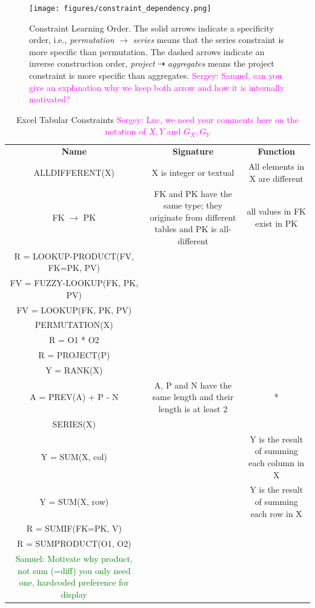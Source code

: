 \documentclass{ecai}
\newcommand{\sergey}[1]{\textcolor{magenta}{{\sc Sergey:} #1}\xspace}
\newcommand{\samuel}[1]{\textcolor{green}{{\sc Samuel:} #1}\xspace}
\newcommand{\format}[1]{\textit{#1}\xspace}
\newcommand{\CName}{Name\xspace}
\newcommand{\CSignature}{Signature\xspace}
\newcommand{\CFunction}{Function\xspace}
\begin{document}
\begin{figure}[htb]
  \centering
  \texttt{[image: figures/constraint\_dependency.png]}
  \caption{Constraint Learning Order. The solid arrows indicate a specificity order, i.e., \textit{permutation} $\rightarrow$ \textit{series} means that the series constraint is more specific than permutation. The dashed arrows indicate an inverse construction order, \textit{project} $\dashrightarrow$ \textit{aggregates} means the project constraint is more specific than aggregates. \sergey{Samuel,  can you give an explanation why we keep both arrow and how it is internally motivated?}}
  \label{fig:learning_order}
\end{figure}


\newcommand{\numeric}{\format{numeric}}
\newcommand{\textual}{\format{textual}}
\newcommand{\integer}{\format{integer}}
\newcommand{\length}{\format{length}}
\newcommand{\nat}{\mathcal{N}}

\begin{table}
  \centering
  \begin{tabular}{ccc}
    \textbf{\CName} & \textbf{\CSignature} & \textbf{\CFunction}\\
    ALLDIFFERENT(X) & X is integer or textual & All elements in X are different \\
    FK $\rightarrow$ PK & FK and PK have the same type; they originate from different tables and PK is all-different & all values in FK exist in PK \\
    R = LOOKUP-PRODUCT(FV, FK=PK, PV) & & \\
    FV = FUZZY-LOOKUP(FK, PK, PV) & & \\
    FV = LOOKUP(FK, PK, PV) & & \\
    PERMUTATION(X) & & \\
    R = O1 * O2 & & \\
    R = PROJECT(P) & & \\
     Y = RANK(X) & & \\
    A = PREV(A) + P - N & A, P and N have the same length and their length is at least 2 & *\\
    SERIES(X) & & \\
    Y = SUM(X, col) & & Y is the result of summing each column in X \\
    Y = SUM(X, row) & & Y is the result of summing each row in X \\
    R = SUMIF(FK=PK, V) & & \\
    R = SUMPRODUCT(O1, O2) & & \\

\samuel{Motivate why product, not sum (=diff) you only need one, hardcoded preference for display}

  \end{tabular}
  \caption{Excel Tabular Constraints \sergey{Luc, we need your comments here on the notation of $X,Y$ and $G_X,G_Y$}}
  \label{table:constraints}
\end{table}
\end{document}
